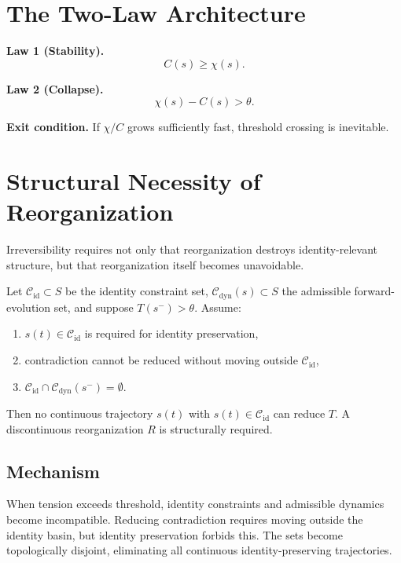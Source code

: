 \documentclass[12pt]{article}
\begin{document}
\section{The Two-Law Architecture}

\textbf{Law 1 (Stability).}
\[
C(s) \ge \chi(s).
\]

\textbf{Law 2 (Collapse).}
\[
\chi(s) - C(s) > \theta.
\]

\textbf{Exit condition.} If $\chi/C$ grows sufficiently fast, threshold crossing is inevitable.

\section{Structural Necessity of Reorganization}

Irreversibility requires not only that reorganization destroys identity-relevant structure, but that reorganization itself becomes unavoidable.

\begin{proposition}
Let $\mathcal{C}_{\mathrm{id}} \subset S$ be the identity constraint set, $\mathcal{C}_{\mathrm{dyn}}(s) \subset S$ the admissible forward-evolution set, and suppose $T(s^-) > \theta$. Assume:
\begin{enumerate}
\item $s(t) \in \mathcal{C}_{\mathrm{id}}$ is required for identity preservation,
\item contradiction cannot be reduced without moving outside $\mathcal{C}_{\mathrm{id}}$,
\item $\mathcal{C}_{\mathrm{id}} \cap \mathcal{C}_{\mathrm{dyn}}(s^-) = \emptyset$.
\end{enumerate}
Then no continuous trajectory $s(t)$ with $s(t) \in \mathcal{C}_{\mathrm{id}}$ can reduce $T$. A discontinuous reorganization $R$ is structurally required.
\end{proposition}

\subsection*{Mechanism}

When tension exceeds threshold, identity constraints and admissible dynamics become incompatible. Reducing contradiction requires moving outside the identity basin, but identity preservation forbids this. The sets become topologically disjoint, eliminating all continuous identity-preserving trajectories.
\end{document}
